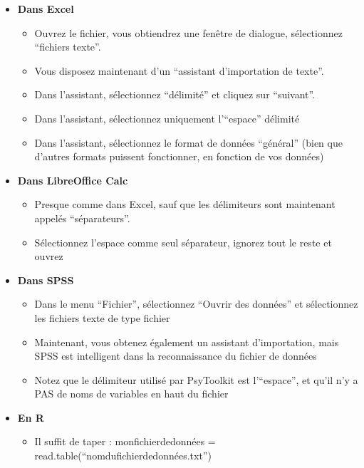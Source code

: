 \documentclass[
]{book}
\providecommand{\tightlist}{%
  \setlength{\itemsep}{0pt}\setlength{\parskip}{0pt}}
\begin{document}
\begin{itemize}
\tightlist
\item
  \textbf{Dans Excel}

  \begin{itemize}
  \tightlist
  \item
    Ouvrez le fichier, vous obtiendrez une fenêtre de dialogue,
    sélectionnez ``fichiers texte''.
  \item
    Vous disposez maintenant d'un ``assistant d'importation de texte''.
  \item
    Dans l'assistant, sélectionnez ``délimité'' et cliquez sur
    ``suivant''.
  \item
    Dans l'assistant, sélectionnez uniquement l'``espace'' délimité
  \item
    Dans l'assistant, sélectionnez le format de données ``général''
    (bien que d'autres formats puissent fonctionner, en fonction de vos
    données)
  \end{itemize}
\item
  \textbf{Dans LibreOffice Calc}

  \begin{itemize}
  \tightlist
  \item
    Presque comme dans Excel, sauf que les délimiteurs sont maintenant
    appelés ``séparateurs''.
  \item
    Sélectionnez l'espace comme seul séparateur, ignorez tout le reste
    et ouvrez
  \end{itemize}
\item
  \textbf{Dans SPSS}

  \begin{itemize}
  \tightlist
  \item
    Dans le menu ``Fichier'', sélectionnez ``Ouvrir des données'' et
    sélectionnez les fichiers texte de type fichier
  \item
    Maintenant, vous obtenez également un assistant d'importation, mais
    SPSS est intelligent dans la reconnaissance du fichier de données
  \item
    Notez que le délimiteur utilisé par PsyToolkit est l'``espace'', et
    qu'il n'y a PAS de noms de variables en haut du fichier
  \end{itemize}
\item
  \textbf{En R}

  \begin{itemize}
  \tightlist
  \item
    Il suffit de taper : monfichierdedonnées =
    read.table(``nomdufichierdedonnées.txt'')
  \end{itemize}
\end{itemize}
\end{document}
